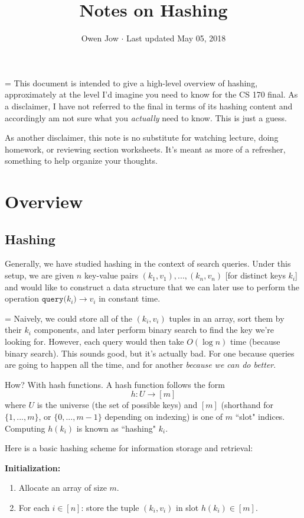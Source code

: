 \documentclass[11pt]{article}
\title{Notes on Hashing}
\author{Owen Jow $\cdot$ Last updated May 05, 2018}
\date{}
\begin{document}
\maketitle

{\parskip=\baselineskip
This document is intended to give a high-level overview of hashing, approximately at the level I'd imagine you need to know for the CS 170 final. As a disclaimer, I have not referred to the final in terms of its hashing content and accordingly am not sure what you \textit{actually} need to know. This is just a guess.

As another disclaimer, this note is no substitute for watching lecture, doing homework, or reviewing section worksheets. It's meant as more of a refresher, something to help organize your thoughts.
}

\section*{Overview}

\subsection*{Hashing}

Generally, we have studied hashing in the context of search queries. Under this setup, we are given $n$ key-value pairs $(k_1, v_1), ..., (k_n, v_n)$ [for distinct keys $k_i$] and would like to construct a data structure that we can later use to perform the operation $\texttt{query(}k_i\texttt{)} \rightarrow v_i$ in constant time.

{\parskip=\baselineskip
Naively, we could store all of the $(k_i, v_i)$ tuples in an array, sort them by their $k_i$ components, and later perform binary search to find the key we're looking for. However, each query would then take $O(\log n)$ time (because binary search). This sounds good, but it's actually bad. For one because queries are going to happen all the time, and for another \textit{because we can do better}.

How? With hash functions. A hash function follows the form
$$h: U \to [m]$$
where $U$ is the universe (the set of possible keys) and $[m]$ (shorthand for $\{1, ..., m\}$, or $\{0, ..., m - 1\}$ depending on indexing) is one of $m$ ``slot" indices. Computing $h(k_i)$ is known as ``hashing" $k_i$.

Here is a basic hashing scheme for information storage and retrieval:

\textbf{Initialization:}
}
\begin{enumerate}
\item Allocate an array of size $m$.
\item For each $i \in [n]$: store the tuple $(k_i, v_i)$ in slot $h(k_i) \in [m]$.
\end{enumerate}
\end{document}
